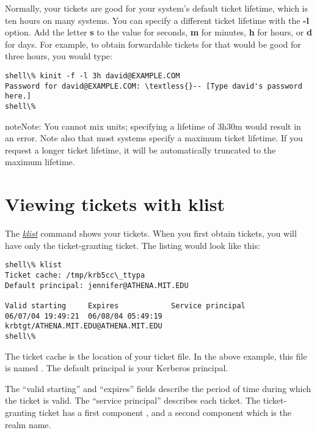 \documentclass[letterpaper,10pt,english]{sphinxmanual}
\begin{document}
Normally, your tickets are good for your system's default ticket
lifetime, which is ten hours on many systems.  You can specify a
different ticket lifetime with the \textbf{-l} option.  Add the letter
\textbf{s} to the value for seconds, \textbf{m} for minutes, \textbf{h} for hours, or
\textbf{d} for days.  For example, to obtain forwardable tickets for
 that would be good for three hours, you would
type:

\begin{Verbatim}[commandchars=\\\{\}]
shell\% kinit -f -l 3h david@EXAMPLE.COM
Password for david@EXAMPLE.COM: \textless{}-- [Type david's password here.]
shell\%
\end{Verbatim}

\begin{notice}{note}{Note:}
You cannot mix units; specifying a lifetime of 3h30m would
result in an error.  Note also that most systems specify a
maximum ticket lifetime.  If you request a longer ticket
lifetime, it will be automatically truncated to the maximum
lifetime.
\end{notice}


\section{Viewing tickets with klist}
\label{user/tkt_mgmt:viewing-tickets-with-klist}\label{user/tkt_mgmt:view-tkt}
The {\hyperref[user/user_commands/klist:klist-1]{\emph{klist}}} command shows your tickets.  When you first obtain
tickets, you will have only the ticket-granting ticket.  The listing
would look like this:

\begin{Verbatim}[commandchars=\\\{\}]
shell\% klist
Ticket cache: /tmp/krb5cc\_ttypa
Default principal: jennifer@ATHENA.MIT.EDU

Valid starting     Expires            Service principal
06/07/04 19:49:21  06/08/04 05:49:19  krbtgt/ATHENA.MIT.EDU@ATHENA.MIT.EDU
shell\%
\end{Verbatim}

The ticket cache is the location of your ticket file. In the above
example, this file is named . The default
principal is your Kerberos principal.

The ``valid starting'' and ``expires'' fields describe the period of time
during which the ticket is valid.  The ``service principal'' describes
each ticket.  The ticket-granting ticket has a first component
, and a second component which is the realm name.
\end{document}

